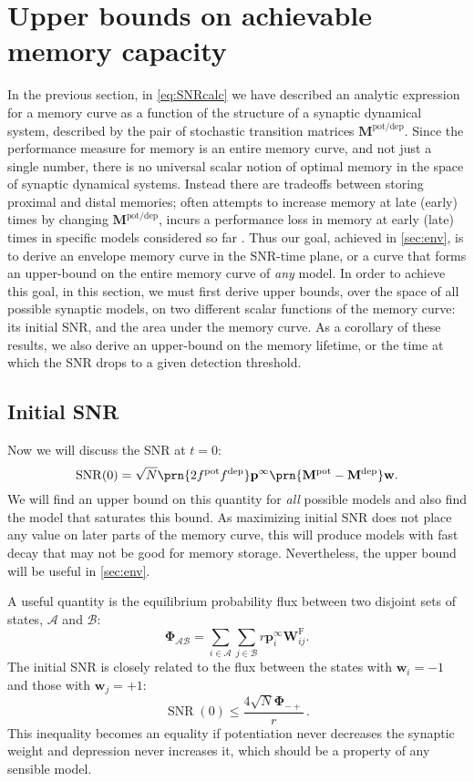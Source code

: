 \documentclass{article} %
\DeclareMathOperator{\snr}{SNR}
\newcommand{\pr}{\mathbf{p}}
\newcommand{\eq}{\pr^\infty}
\newcommand{\w}{\mathbf{w}}
\newcommand{\W}{\mathbf{W}}
\newcommand{\M}{\mathbf{M}}
\newcommand{\frg}{\W^{\mathrm{F}}}
\newcommand{\F}{\boldsymbol{\Phi}}
\newcommand{\pot}{^{\text{pot}}}
\newcommand{\dep}{^{\text{dep}}}
\newcommand{\potdep}{^{\text{pot/dep}}}
\newcommand{\CA}{\mathcal{A}}
\newcommand{\CB}{\mathcal{B}}
\begin{document}
\section{Upper bounds on achievable memory capacity}\label{sec:bounds}

In the previous section, in \eqref{eq:SNRcalc} we have described an analytic expression for a memory curve as a function of the structure of a synaptic dynamical system, described by the pair of stochastic transition matrices  $\M\potdep$.
Since the performance measure for memory is an entire memory curve, and not just a single number, there is no universal scalar notion of optimal memory in the space of synaptic dynamical systems.
Instead there are tradeoffs between storing proximal and distal memories;  often attempts to increase memory at late (early) times by changing $\M\potdep$, incurs a performance loss in memory at early (late) times in specific models considered so far \cite{Fusi2005cascade,Fusi2007multistate,Leibold2008serial}.
Thus our goal, achieved in \autoref{sec:env}, is to derive an envelope memory curve in the SNR-time plane, or a curve that forms an upper-bound on the entire memory curve of {\it any} model.
In order to achieve this goal, in this section, we must first derive upper bounds, over the space of all possible synaptic models, on two different scalar functions of the memory curve: its initial SNR, and the area under the memory curve.
As a corollary of these results, we also derive an upper-bound on the memory lifetime, or the time at which the SNR drops to a given detection threshold.


\subsection{Initial SNR}\label{sec:initial}

Now we will discuss the SNR at $t=0$:
%
\begin{equation}\label{eq:init}
  \snr(0) = \sqrt{N}\prn{2 f\pot f\dep} \eq \prn{\M\pot-\M\dep} \w.
\end{equation}
%
We will find an upper bound on this quantity for \emph{all} possible models and also find the model that saturates this bound.
As maximizing initial SNR does not place any value on later parts of the memory curve, this will produce models with fast decay that may not be good for memory storage.
Nevertheless, the upper bound will be useful in \autoref{sec:env}.

A useful quantity is the equilibrium probability flux between two disjoint sets of states, $\CA$ and $\CB$:
%
\begin{equation}\label{eq:flux}
  \F_{\CA\CB} = \sum_{i\in\CA} \sum_{j\in\CB} r \eq_i \frg_{ij}.
\end{equation}
%
The initial SNR is closely related to the flux between the states with $\w_i=-1$ and those with $\w_j=+1$:
%
\begin{equation}\label{eq:initflux}
  \snr(0) \leq \frac{4\sqrt{N}\F_{-+}}{r}\,.
\end{equation}
%
This inequality becomes an equality if potentiation never decreases the synaptic weight and depression never increases it, which should be a property of any sensible model.
\end{document}
